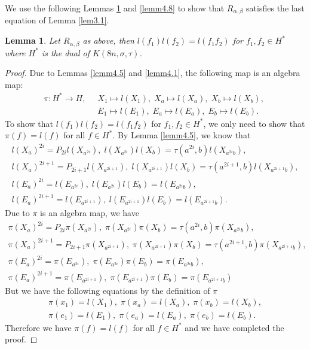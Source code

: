 \documentclass[a4paper,11pt]{amsart}
\numberwithin{equation}{section}
\newtheorem{lemma}[theorem]{Lemma}
\begin{document}
We use the following Lemmas \ref{lemm4.6} and  \ref{lemm4.8} to show that $R_{\alpha,\beta}$ satisfies the last equation of Lemma \ref{lem3.1}.
\begin{lemma}\label{lemm4.6}
Let $R_{\alpha,\beta}$ as above, then $l(f_1)l(f_2)=l(f_1 f_2)$ for $f_1,f_2\in H^*$ where $H^*$ is the dual of $K(8n,\sigma,\tau)$.
\end{lemma}
\begin{proof}
Due to Lemmas \ref{lemm4.5} and \ref{lemm4.1}, the following map is an algebra map:
 \begin{align*}\pi\colon H^*\rightarrow H,\;\;&X_1\mapsto l(X_1),\;X_a\mapsto l(X_a),\; X_b\mapsto l(X_b),\; \\
 & E_1\mapsto l(E_1),\; E_a\mapsto l(E_a),\; E_b\mapsto l(E_b).\end{align*}
To show that $l(f_1)l(f_2)=l(f_1 f_2)$ for $f_1,f_2\in H^*$, we only need to show that $\pi(f)=l(f)$ for all $f\in H^*$. By Lemma \ref{lemm4.5}, we know that
\begin{gather*}
l(X_a)^{2i}=P_{2i}l(X_{a^{2i}}),\; l(X_{a^{2i}})l(X_b)=\tau(a^{2i},b)l(X_{a^{2i}b}),\\
l(X_a)^{2i+1}=P_{2i+1}l(X_{a^{2i+1}}),\; l(X_{a^{2i+1}})l(X_b)=\tau(a^{2i+1},b)l(X_{a^{2i+1}b}),\\
l(E_a)^{2i}=l(E_{a^{2i}}),\; l(E_{a^{2i}})l(E_b)=l(E_{a^{2i}b}),\\
l(E_a)^{2i+1}=l(E_{a^{2i+1}}),\; l(E_{a^{2i+1}})l(E_b)=l(E_{a^{2i+1}b}).
\end{gather*}
Due to $\pi$ is an algebra map, we have
\begin{gather*}
\pi(X_a)^{2i}=P_{2i}\pi(X_{a^{2i}}),\; \pi(X_{a^{2i}})\pi(X_b)=\tau(a^{2i},b)\pi(X_{a^{2i}b}),\\
\pi(X_a)^{2i+1}=P_{2i+1}\pi(X_{a^{2i+1}}),\; \pi(X_{a^{2i+1}})\pi(X_b)=\tau(a^{2i+1},b)\pi(X_{a^{2i+1}b}),\\
\pi(E_a)^{2i}=\pi(E_{a^{2i}}),\; \pi(E_{a^{2i}})\pi(E_b)=\pi(E_{a^{2i}b}),\\
\pi(E_a)^{2i+1}=\pi(E_{a^{2i+1}}),\; \pi(E_{a^{2i+1}})\pi(E_b)=\pi(E_{a^{2i+1}b})
\end{gather*}
But we have the following equations by the definition of $\pi$
\begin{gather*}
\pi(x_1)=l(X_1),\; \pi(x_a)=l(X_a),\; \pi(x_b)=l(X_b),\\
\pi(e_1)=l(E_1),\; \pi(e_a)=l(E_a),\; \pi(e_b)=l(E_b).
\end{gather*}
Therefore we have $\pi(f)=l(f)$ for all $f\in H^*$ and we have completed the proof.

\end{proof}
\end{document}
